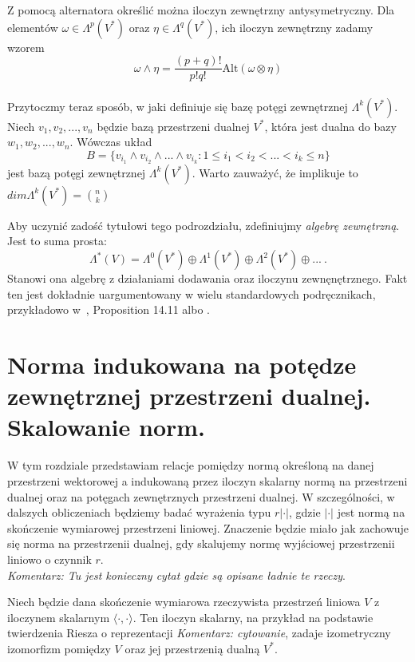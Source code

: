 \documentclass[licencjacka]{pracamgr}
\theoremstyle{definition}
\theoremstyle{definition}
\theoremstyle{plain}
\theoremstyle{plain}
\theoremstyle{plain}
\theoremstyle{plain}
\begin{document}
Z pomocą alternatora określić można iloczyn zewnętrzny antysymetryczny. 
Dla elementów $\omega \in \Lambda^p (V^\ast)$ oraz 
$\eta \in \Lambda^q (V^\ast)$, ich iloczyn zewnętrzny zadamy wzorem
\[
  \omega \wedge \eta = \frac{(p+q)!}{p!q!} \text{Alt} (\omega \otimes \eta)
\] \\

Przytoczmy teraz sposób, w jaki definiuje się bazę potęgi zewnętrznej
$\Lambda^k(V^\ast)$. Niech $v_1, v_2, ... , v_n$ będzie bazą przestrzeni dualnej
$V^\ast$, która jest dualna do bazy $w_1, w_2, ..., w_n$.
Wówczas układ
\[
  B = \{ v_{i_1} \wedge v_{i_2} \wedge ... \wedge v_{i_k} : 1 \leq i_1 < i_2 < ... <i_k \leq n \}
\]
jest bazą potęgi zewnętrznej $\Lambda^k(V^\ast)$. Warto zauważyć, że implikuje
 to $dim \Lambda^k ( V^\ast)= \binom{n}{k}$

Aby uczynić zadość tytułowi tego podrozdziału, zdefiniujmy
\emph{algebrę zewnętrzną}. Jest to suma prosta:
\[
\Lambda^\ast (V) = 
\Lambda^0(V^\ast) \oplus
\Lambda^1(V^\ast) \oplus
\Lambda^2(V^\ast) \oplus
...~.
\] Stanowi ona algebrę z działaniami dodawania oraz iloczynu zewnęnętrznego.
Fakt ten jest dokładnie uargumentowany w wielu standardowych podręcznikach,
przykładowo w~\cite{lee}, Proposition 14.11 albo \cite{kostrikin}.\\


\section{Norma indukowana na potędze zewnętrznej przestrzeni dualnej.
Skalowanie norm.}

W tym rozdziale przedstawiam relacje pomiędzy normą określoną na danej
przestrzeni wektorowej a indukowaną przez iloczyn skalarny normą na przestrzeni
dualnej oraz na potęgach zewnętrznych przestrzeni dualnej.  W szczególności, w
dalszych obliczeniach będziemy badać wyrażenia typu $r |\cdot|$, gdzie
$|\cdot|$ jest normą na skończenie wymiarowej przestrzeni liniowej.  Znaczenie
będzie miało jak zachowuje się norma na przestrzenii dualnej, gdy skalujemy
normę wyjściowej przestrzenii liniowo o czynnik $r$. \\

\emph{Komentarz: Tu jest konieczny cytat gdzie są opisane ładnie te rzeczy}.

Niech będzie dana skończenie wymiarowa rzeczywista przestrzeń liniowa $V$ z
iloczynem skalarnym $\langle \cdot, \cdot \rangle$.
Ten iloczyn skalarny, na przykład na podstawie twierdzenia Riesza o
reprezentacji \emph{Komentarz: cytowanie}, zadaje izometryczny izomorfizm
pomiędzy $V$ oraz jej przestrzenią dualną $V^\ast$.
\end{document}
